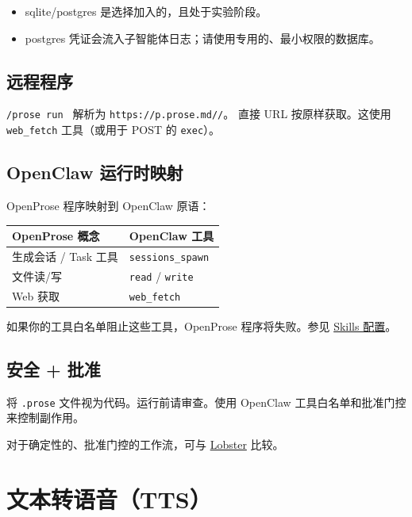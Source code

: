 \begin{itemize}
  \item sqlite/postgres 是选择加入的，且处于实验阶段。
  \item postgres 凭证会流入子智能体日志；请使用专用的、最小权限的数据库。
\end{itemize}


\subsection{远程程序}


\texttt{/prose run } 解析为 \texttt{https://p.prose.md//}。
直接 URL 按原样获取。这使用 \texttt{web\_fetch} 工具（或用于 POST 的 \texttt{exec}）。

\subsection{OpenClaw 运行时映射}


OpenProse 程序映射到 OpenClaw 原语：


\begin{table}[h]
\centering
\small
\begin{tabular}{|l|l|}
\hline
OpenProse 概念 & OpenClaw 工具 \\
\hline
生成会话 / Task 工具 & \texttt{sessions\_spawn} \\
\hline
文件读/写 & \texttt{read} / \texttt{write} \\
\hline
Web 获取 & \texttt{web\_fetch} \\
\hline
\end{tabular}
\end{table}



如果你的工具白名单阻止这些工具，OpenProse 程序将失败。参见 \href{/tools/skills-config}{Skills 配置}。

\subsection{安全 + 批准}


将 \texttt{.prose} 文件视为代码。运行前请审查。使用 OpenClaw 工具白名单和批准门控来控制副作用。

对于确定性的、批准门控的工作流，可与 \href{/tools/lobster}{Lobster} 比较。


\clearpage

\section{文本转语音（TTS）}


